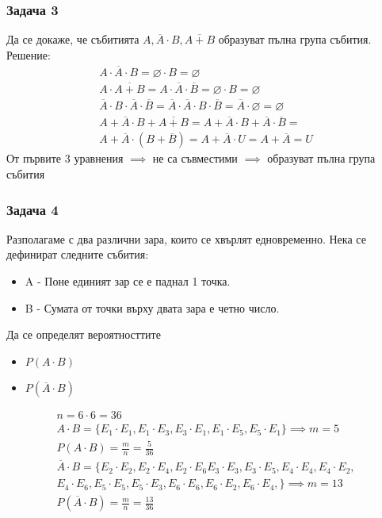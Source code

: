 \documentclass[fleqn, 12pt]{article}
\theoremstyle{definition}
\begin{document}
\subsubsection*{Задача 3}
Да се докаже, че събитията $A, \overline{A} \cdot B, \overline{A+B}$ образуват пълна група събития. \\
Решение: \\
\begin{gather*}
A \cdot \overline{A} \cdot B = \varnothing \cdot B = \varnothing \\
A \cdot \overline{A+B} = A \cdot \overline{A} \cdot \overline{B} = \varnothing \cdot B = \varnothing \\
\overline{A} \cdot B  \cdot \overline{A} \cdot \overline{B} = \overline{A} \cdot \overline{A} \cdot B \cdot \overline{B} = \overline{A} \cdot \varnothing = \varnothing  \\
A + \overline{A} \cdot B + \overline{A+B} = 
A + \overline{A} \cdot B + \overline{A} \cdot \overline{B} = \\
A + \overline{A} \cdot (B + \overline{B}) = 
A + \overline{A} \cdot U = 
A + \overline{A} = U 
\end{gather*}
От първите 3 уравнения $\implies$ не са съвместими $\implies$ образуват пълна група събития

\subsubsection*{Задача 4}
Разполагаме с два различни зара, които се хвърлят едновременно. Нека се дефинират следните събития: 
\begin{itemize}
\item A -  Поне единият зар се е паднал 1 точка. 
\item B -  Сумата от точки върху двата зара е четно число. 
\end{itemize}
Да се определят вероятносттите 
\begin{itemize}
\item $P(A \cdot B)$
\item $P(\overline{A} \cdot B)$
\end{itemize}

\begin{gather*}
n = 6 \cdot 6 = 36 \\
A \cdot B = \{E_1 \cdot E_1, E_1 \cdot E_3, E_3 \cdot E_1, E_1 \cdot E_5, E_5 \cdot E_1 \} \implies m = 5 \\
P(A \cdot B) = \frac{m}{n} = \frac{5}{36} \\
\overline{A} \cdot B = \{E_2 \cdot E_2, E_2 \cdot E_4, E_2 \cdot E_6
E_3 \cdot E_3, E_3 \cdot E_5, 
E_4 \cdot E_4, E_4 \cdot E_2,\\ E_4 \cdot E_6,
E_5 \cdot E_5, E_5 \cdot E_3,
E_6 \cdot E_6, E_6 \cdot E_2, E_6 \cdot E_4, 
\} \implies m = 13 \\
P(\overline{A} \cdot B) = \frac{m}{n} = \frac{13}{36} 
\end{gather*}
\end{document}

